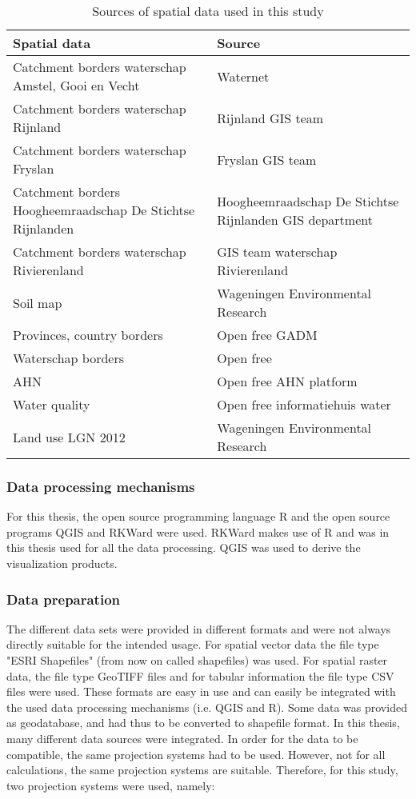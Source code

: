 \documentclass[a4paper,12pt]{scrbook}
\begin{document}
\begin{table}[htbp]
\caption{Sources of spatial data used in this study}
\begin{center}
\begin{tabular}{|p{7cm}|p{7cm}|}
\hline
\textbf{Spatial data} & \textbf{Source} \\ \hline
Catchment borders waterschap Amstel, Gooi en Vecht & Waternet  \\ \hline
Catchment borders waterschap Rijnland & Rijnland GIS team \\ \hline
Catchment borders waterschap Fryslan & Fryslan GIS team \\ \hline
Catchment borders Hoogheemraadschap De Stichtse Rijnlanden & Hoogheemraadschap De Stichtse Rijnlanden GIS department \\ \hline
Catchment borders waterschap Rivierenland & GIS team waterschap Rivierenland \\ \hline
Soil map & Wageningen Environmental Research \\ \hline
Provinces, country borders & Open free GADM \\ \hline
Waterschap borders & Open free \\ \hline
AHN & Open free AHN platform \\ \hline
Water quality & Open free informatiehuis water \\ \hline
Land use LGN 2012 & Wageningen Environmental Research \\ \hline
\end{tabular}
\end{center}
\label{tab:spatialdatasources}
\end{table}

\subsubsection{Data processing mechanisms}
For this thesis, the open source programming language R and the open source programs \ac{QGIS} and RKWard were used. RKWard makes use of R and was in this thesis used for all the data processing. \ac{QGIS} was used to derive the visualization products.

\subsubsection{Data preparation}
The different data sets were provided in different formats and were not always directly suitable for the intended usage. For spatial vector data the file type "ESRI Shapefiles" (from now on called shapefiles) was used. For spatial raster data, the file type \ac{GeoTIFF} files and for tabular information the file type \ac{CSV} files were used. These formats are easy in use and can easily be integrated with the used data processing mechanisms (i.e. \ac{QGIS} and R). Some data was provided as geodatabase, and had thus to be converted to shapefile format. In this thesis, many different data sources were integrated. In order for the data to be compatible, the same projection systems had to be used. However, not for all calculations, the same projection systems are suitable. Therefore, for this study, two projection systems were used, namely:
\end{document}
